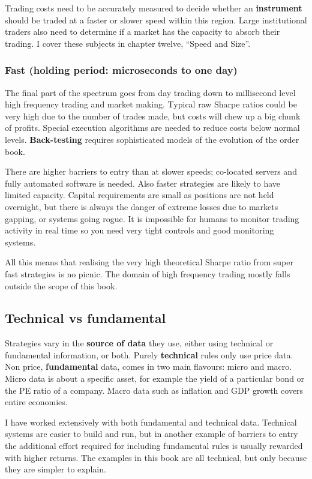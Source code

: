 Trading costs need to be accurately measured to decide whether an \textbf{instrument} should be traded at a faster or slower speed within this region. Large institutional traders also need to determine if a market has the capacity to absorb their trading. I cover these subjects in chapter twelve, ``Speed and Size''.

\subsubsection*{Fast (holding period: microseconds to one day)}

The final part of the spectrum goes from day trading down to millisecond level high frequency trading and market making. Typical raw Sharpe ratios could be very high due to the number of trades made, but costs will chew up a big chunk of profits. Special execution algorithms are needed to reduce costs below normal levels. \textbf{Back-testing} requires sophisticated models of the evolution of the order book.

There are higher barriers to entry than at slower speeds; co-located servers and fully automated software is needed. Also faster strategies are likely to have limited capacity. Capital requirements are small as positions are not held overnight, but there is always the danger of extreme losses due to markets gapping, or systems going rogue. It is impossible for humans to monitor trading activity in real time so you need very tight controls and good monitoring systems.

All this means that realising the very high theoretical Sharpe ratio from super fast strategies is no picnic. The domain of high frequency trading mostly falls outside the scope of this book.

\subsection*{Technical vs fundamental}

Strategies vary in the \textbf{source of data} they use, either using technical or fundamental information, or both. Purely \textbf{technical} rules only use price data. Non price, \textbf{fundamental} data, comes in two main flavours: micro and macro. Micro data is about a specific asset, for example the yield of a particular bond or the PE ratio of a company. Macro data such as inflation and GDP growth covers entire economies.

I have worked extensively with both fundamental and technical data. Technical systems are easier to build and run, but in another example of barriers to entry the additional effort required for including fundamental rules is usually rewarded with higher returns. The examples in this book are all technical, but only because they are simpler to explain.

